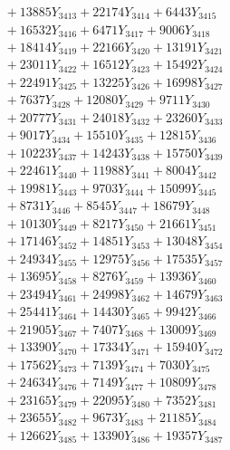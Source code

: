 \documentclass[a4paper,10pt]{article}
\begin{document}
{\begin{align}
&\;  + 13885 Y_{3413} + 22174 Y_{3414} + 6443 Y_{3415} \\[0.3ex]
&\;  + 16532 Y_{3416} + 6471 Y_{3417} + 9006 Y_{3418} \\[0.5ex]\allowbreak
&\;  + 18414 Y_{3419} + 22166 Y_{3420} + 13191 Y_{3421} \\[0.3ex]
&\;  + 23011 Y_{3422} + 16512 Y_{3423} + 15492 Y_{3424} \\[0.3ex]
&\;  + 22491 Y_{3425} + 13225 Y_{3426} + 16998 Y_{3427} \\[0.3ex]
&\;  + 7637 Y_{3428} + 12080 Y_{3429} + 9711 Y_{3430} \\[0.3ex]
&\;  + 20777 Y_{3431} + 24018 Y_{3432} + 23260 Y_{3433} \\[0.3ex]
&\;  + 9017 Y_{3434} + 15510 Y_{3435} + 12815 Y_{3436} \\[0.3ex]
&\;  + 10223 Y_{3437} + 14243 Y_{3438} + 15750 Y_{3439} \\[0.3ex]
&\;  + 22461 Y_{3440} + 11988 Y_{3441} + 8004 Y_{3442} \\[0.3ex]
&\;  + 19981 Y_{3443} + 9703 Y_{3444} + 15099 Y_{3445} \\[0.3ex]
&\;  + 8731 Y_{3446} + 8545 Y_{3447} + 18679 Y_{3448} \\[0.5ex]\allowbreak
&\;  + 10130 Y_{3449} + 8217 Y_{3450} + 21661 Y_{3451} \\[0.3ex]
&\;  + 17146 Y_{3452} + 14851 Y_{3453} + 13048 Y_{3454} \\[0.3ex]
&\;  + 24934 Y_{3455} + 12975 Y_{3456} + 17535 Y_{3457} \\[0.3ex]
&\;  + 13695 Y_{3458} + 8276 Y_{3459} + 13936 Y_{3460} \\[0.3ex]
&\;  + 23494 Y_{3461} + 24998 Y_{3462} + 14679 Y_{3463} \\[0.3ex]
&\;  + 25441 Y_{3464} + 14430 Y_{3465} + 9942 Y_{3466} \\[0.3ex]
&\;  + 21905 Y_{3467} + 7407 Y_{3468} + 13009 Y_{3469} \\[0.3ex]
&\;  + 13390 Y_{3470} + 17334 Y_{3471} + 15940 Y_{3472} \\[0.3ex]
&\;  + 17562 Y_{3473} + 7139 Y_{3474} + 7030 Y_{3475} \\[0.3ex]
&\;  + 24634 Y_{3476} + 7149 Y_{3477} + 10809 Y_{3478} \\[0.5ex]\allowbreak
&\;  + 23165 Y_{3479} + 22095 Y_{3480} + 7352 Y_{3481} \\[0.3ex]
&\;  + 23655 Y_{3482} + 9673 Y_{3483} + 21185 Y_{3484} \\[0.3ex]
&\;  + 12662 Y_{3485} + 13390 Y_{3486} + 19357 Y_{3487} \\[0.3ex]

\end{align}}
\end{document}
